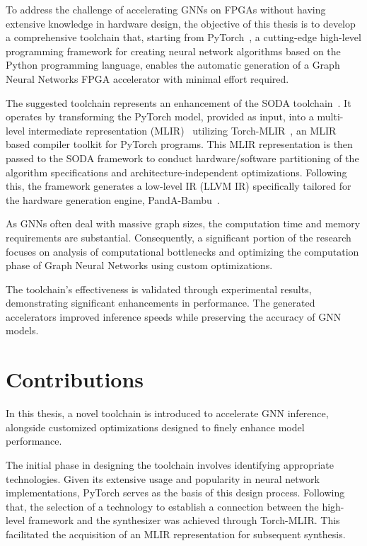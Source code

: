To address the challenge of accelerating GNNs on FPGAs without having extensive knowledge in hardware design, the objective of this thesis is to develop a comprehensive toolchain that, starting from PyTorch~\cite{DBLP:journals/corr/abs-1912-01703},
a cutting-edge high-level programming framework for creating neural network algorithms based on the Python programming language, enables the
automatic generation of a Graph Neural Networks FPGA accelerator with minimal effort required.

The suggested toolchain represents an enhancement of the SODA toolchain~\cite{9786533}.
It operates by transforming the PyTorch model, provided as input, into a multi-level intermediate representation
(MLIR)~\cite{9370308} utilizing Torch-MLIR~\cite{torch_mlir}, an MLIR based compiler toolkit for PyTorch programs.
This MLIR representation is then passed to the SODA framework to conduct hardware/software partitioning of the algorithm
specifications and architecture-independent optimizations.
Following this, the framework generates a low-level IR (LLVM IR) specifically tailored for the hardware generation engine,
PandA-Bambu~\cite{9586110}.

As GNNs often deal with massive graph sizes, the computation time and memory requirements are substantial.
Consequently, a significant portion of the research focuses on analysis of computational bottlenecks and optimizing the computation phase of Graph Neural Networks using
custom optimizations.

The toolchain's effectiveness is validated through experimental results, demonstrating significant enhancements in performance.
The generated accelerators improved inference speeds while preserving the accuracy of GNN models.

\section{Contributions}
\label{sec:contributions}%

In this thesis, a novel toolchain is introduced to accelerate GNN inference, alongside customized optimizations designed to finely enhance model performance.

The initial phase in designing the toolchain involves identifying appropriate technologies.
Given its extensive usage and popularity in neural network implementations, PyTorch serves as the basis of this design process.
Following that, the selection of a technology to establish a connection between the high-level framework and the synthesizer was achieved through Torch-MLIR\@.
This facilitated the acquisition of an MLIR representation for subsequent synthesis.

